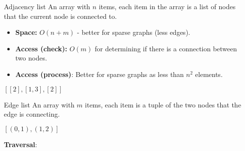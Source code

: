 \begin{theorem}
    {Adjacency list}
    An array with $n$ items, each item in the array is a list of nodes that the current node is connected to.

    \begin{itemize}
        \item \textbf{Space:} $O(n+m)$ - better for sparse graphs (less edges).
        \item \textbf{Access (check):} $O(m)$ for determining if there is a connection between two nodes.
        \item \textbf{Access (process)}: Better for sparse graphs as less than $n^2$ elements.
    \end{itemize}

    \tcblower

    \begin{center}
        \hspace{1cm}
        $
            [
                    [2],
                    [1,3],
                    [2]
                ]
        $
    \end{center}
\end{theorem}

\begin{theorem}
    {Edge list}
    An array with $m$ items, each item is a tuple of the two nodes that the edge is connecting.
    \tcblower

    \begin{center}
        \hspace{1cm}
        $
            [
                    (0,1),
                    (1,2)
                ]
        $
    \end{center}
\end{theorem}

\textbf{Traversal}:

